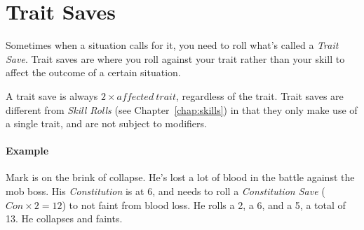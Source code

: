 \section{Trait Saves}
Sometimes when a situation calls for it, you need to roll what's called a \textit{Trait Save}.
Trait saves are where you roll against your trait rather than your skill to affect the outcome of a certain situation.

A trait save is always $2 \times \mathit{affected\ trait}$, regardless of the trait.
Trait saves are different from \textit{Skill Rolls} (see Chapter~\ref{chap:skills}) in that they only make use of a single trait, and are not subject to modifiers.

\paragraph{Example} Mark is on the brink of collapse.
He's lost a lot of blood in the battle against the mob boss.
His \textit{Constitution} is at 6, and needs to roll a \textit{Constitution Save} ($Con \times 2 = 12$) to not faint from blood loss.
He rolls a 2, a 6, and a 5, a total of 13. He collapses and faints.
